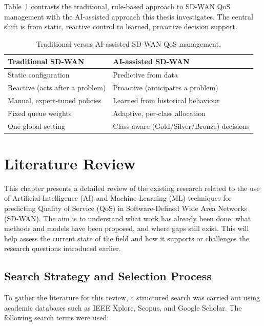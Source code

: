 \documentclass[a4paper,12pt]{Classes/RoboticsLaTeX}
\begin{document}
    Table~\ref{tab:trad_vs_ai} contrasts the traditional, rule-based approach to SD-WAN QoS management with the AI-assisted approach this thesis investigates. The central shift is from static, reactive control to learned, proactive decision support.

    \begin{table}[H]
    \centering
    \caption{Traditional versus AI-assisted SD-WAN QoS management.}
    \label{tab:trad_vs_ai}
    \begin{tabular}{|p{5.5cm}|p{5.5cm}|}
    \hline
    \textbf{Traditional SD-WAN} & \textbf{AI-assisted SD-WAN} \\
    \hline
    Static configuration & Predictive from data \\
    \hline
    Reactive (acts after a problem) & Proactive (anticipates a problem) \\
    \hline
    Manual, expert-tuned policies & Learned from historical behaviour \\
    \hline
    Fixed queue weights & Adaptive, per-class allocation \\
    \hline
    One global setting & Class-aware (Gold/Silver/Bronze) decisions \\
    \hline
    \end{tabular}
    \end{table}

\chapter{Literature Review}
\label{chap:lit_review}

This chapter presents a detailed review of the existing research related to the use of Artificial Intelligence (AI) and Machine Learning (ML) techniques for predicting Quality of Service (QoS) in Software-Defined Wide Area Networks (SD-WAN). The aim is to understand what work has already been done, what methods and models have been proposed, and where gaps still exist. This will help assess the current state of the field and how it supports or challenges the research questions introduced earlier.

\section{Search Strategy and Selection Process}

To gather the literature for this review, a structured search was carried out using academic databases such as IEEE Xplore, Scopus, and Google Scholar. The following search terms were used:
\end{document}
